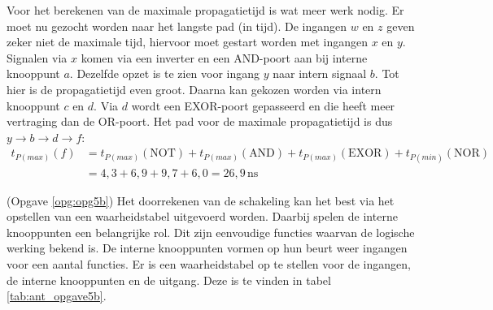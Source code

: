 \documentclass[a4paper,12pt,addpoints,fleqn,dutch]{tisdexam}
\begin{document}
\begin{questions}
Voor het berekenen van de maximale propagatietijd is wat meer werk nodig. Er moet nu
gezocht worden naar het langste pad (in tijd). De ingangen $w$ en $z$ geven zeker niet
de maximale tijd, hiervoor moet gestart worden met ingangen $x$ en $y$. Signalen via
$x$ komen via een inverter en een AND-poort aan bij interne knooppunt $a$. Dezelfde
opzet is te zien voor ingang $y$ naar intern signaal $b$. Tot hier is de propagatietijd even
groot. Daarna kan gekozen worden via intern knooppunt $c$ en $d$. Via $d$ wordt een
EXOR-poort gepasseerd en die heeft meer vertraging dan de OR-poort. Het pad voor de maximale
propagatietijd is dus $y \rightarrow b \rightarrow d \rightarrow f$:
\begin{equation*}
\begin{split}
t_{P(max)}(f) &= t_{P(max)}(\text{NOT}) + t_{P(max)}(\text{AND}) + t_{P(max)}(\text{EXOR}) + t_{P(min)}(\text{NOR}) \\
              &= 4,3 + 6,9 + 9,7 + 6,0 = 26,9 \, \textrm{ns}
\end{split}
\end{equation*}

(Opgave \ref{opg:opg5b}) Het doorrekenen van de schakeling kan het best via het opstellen
van een waarheidstabel uitgevoerd worden. Daarbij spelen de interne knooppunten een
belangrijke rol. Dit zijn eenvoudige functies waarvan de logische werking bekend is.
De interne knooppunten vormen op hun beurt weer ingangen voor een aantal functies.
Er is een waarheidstabel op te stellen voor de ingangen, de interne knooppunten en de
uitgang. Deze is te vinden in tabel \ref{tab:ant_opgave5b}.


\end{questions}
\end{document}
